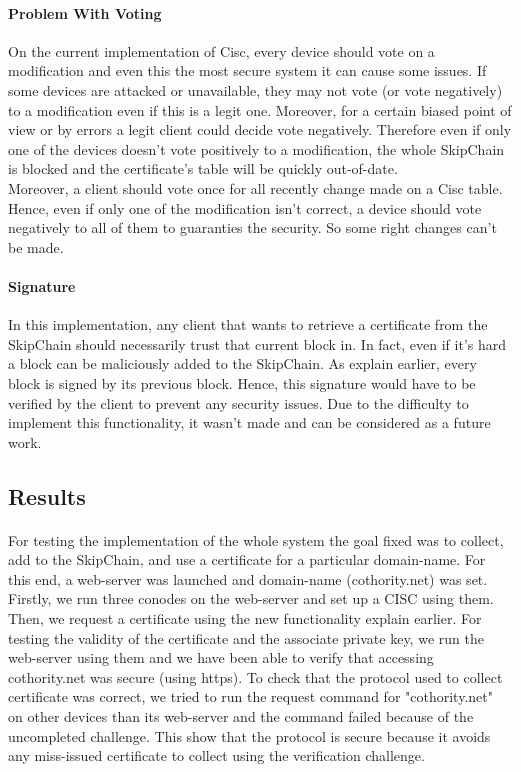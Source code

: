 \documentclass[11pt, a4paper, twoside, openright]{article}
\begin{document}
\paragraph{Problem With Voting}
On the current implementation of Cisc, every device should vote on a modification and even this the most secure system it can cause some issues. If some devices are attacked or  unavailable, they may not vote (or vote negatively) to a modification even if this is a legit one. Moreover, for a certain biased point of view or by errors a legit client could decide vote negatively. Therefore even if only one of the devices doesn't vote positively to a modification, the whole SkipChain is blocked and the certificate's table will be quickly out-of-date.
\\Moreover, a client should vote once for all recently change made on a Cisc table. Hence, even if only one of the modification isn't correct, a device should vote negatively to all of them to guaranties the security. So some right changes can't be made.        
\paragraph{Signature}
In this implementation, any client that wants to retrieve a certificate from the SkipChain should necessarily trust that current block in. In fact, even if it's hard a block can be maliciously added to the SkipChain.
As explain earlier, every block is signed by its previous block. Hence, this signature would have to be verified by the client to prevent any security issues. Due to the difficulty to implement this functionality, it wasn't made and can be considered as a future work.
\subsection{Results}
\paragraph{}For testing the implementation of the whole system the goal fixed was to collect, add to the SkipChain, and use a certificate for a particular domain-name. For this end, a web-server was launched and domain-name (cothority.net) was set. 
Firstly, we run three conodes on the web-server and set up a CISC using them. Then, we request a certificate using the new functionality explain earlier. For testing the validity of the certificate and the associate private key, we run the web-server using them and we have been able to verify that accessing cothority.net was secure (using https). To check that the protocol used to collect certificate was correct, we tried to run the request command for "cothority.net" on other devices than its web-server and the command failed because of the uncompleted challenge. This show that the protocol is secure because it avoids any miss-issued certificate to collect using the verification challenge.
\end{document}
